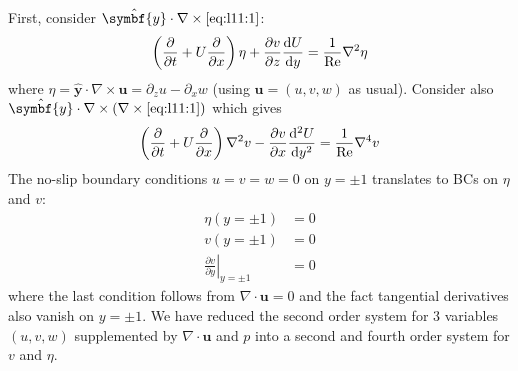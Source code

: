 \documentclass{jknotes}
\renewcommand{\u}{\symbf{u}}
\newcommand{\ReN}{\text{Re}}
\begin{document}
First, consider $\hat{\symbf{y}} \cdot \nabla \times \eqref{eq:l11:1}$:
\begin{equation}
	\left(\frac{\partial}{\partial t} + U \frac{\partial}{\partial x}\right)
	\eta + \frac{\partial v}{\partial z} \frac{\diffd U}{\diffd y} =
	\frac{1}{\ReN} \nabla^2 \eta
\end{equation}
where $\eta = \symbf{\hat{y}} \cdot \nabla \times \u = \partial_z u -
\partial_x w$ (using $\u = (u, v, w)$ as usual). Consider also
$\hat{\symbf{y}} \cdot \nabla \times (\nabla \times \eqref{eq:l11:1})$ which
gives
\begin{equation}
	\left(\frac{\partial}{\partial t} + U \frac{\partial}{\partial x}\right)
	\nabla^2 v - \frac{\partial v}{\partial x} \frac{\diffd^2 U}{\diffd y^2} =
		\frac{1}{\ReN} \nabla^4 v
\end{equation}
The no-slip boundary conditions $u = v = w = 0$ on $y = \pm 1$ translates to
BCs on $\eta$ and $v$:
\begin{align}
	\eta(y=\pm 1) &= 0 \\
	v(y=\pm 1) &= 0 \\
	\left.\frac{\partial v}{\partial y}\right|_{y=\pm 1} &= 0
\end{align}
where the last condition follows from $\nabla \cdot \u = 0$ and the fact
tangential derivatives also vanish on $y = \pm 1$. We have reduced the second
order system for 3 variables $(u, v, w)$ supplemented by $\nabla \cdot \u$ and
$p$ into a second and fourth order system for $v$ and $\eta$. 
\end{document}
